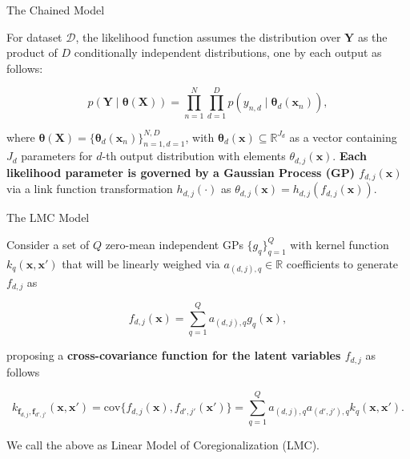 \begin{frame}{The Chained Model}

\begin{block}{}
	For dataset $\mathcal{D}$, the likelihood function assumes the distribution over \(  \boldsymbol{Y} \) as the product of \( D \) conditionally independent distributions, one by each output as follows:
\end{block}

\[
	p(\boldsymbol{Y} \mid \boldsymbol{\theta}(\boldsymbol{X})) = \prod_{n=1}^N \prod_{d=1}^D p\left(y_{n,d} \mid \boldsymbol{\theta}_d(\boldsymbol{x}_n)\right),
\]

\begin{block}{}
	where \( \boldsymbol{\theta}(\boldsymbol{X}) = \{ \boldsymbol{\theta}_d(\boldsymbol{x}_n) \}_{n=1,d=1}^{N, D} \), with \( \boldsymbol{\theta}_d(\boldsymbol{x}) \subseteq \mathbb{R}^{J_d} \) as a vector containing \( J_d \) parameters for \( d \)-th output distribution with elements \( \theta_{d,j}(\boldsymbol{x}) \). \textcolor{BrandTeal}{\textbf{Each likelihood parameter is governed by a Gaussian Process (GP) \( f_{d,j}(\boldsymbol{x}) \)}} via a link function transformation \( h_{d,j}(\cdot) \) as \( \theta_{d,j}(\boldsymbol{x}) = h_{d,j}(f_{d,j}(\boldsymbol{x})) \).
\end{block}

\end{frame}

\begin{frame}{The LMC Model}
	
\begin{block}{}
	Consider a set of \( Q \) zero-mean independent GPs \( \{ g_q \}_{q=1}^Q \) with kernel function \(k_q(\boldsymbol{x}, \boldsymbol{x}')\) that will be linearly weighed via \( a_{(d,j),q} \in \mathbb{R} \) coefficients to generate \( f_{d,j} \) as
\end{block}	


\[
	f_{d,j}(\boldsymbol{x}) = \sum_{q=1}^Q a_{(d,j),q} g_{q}(\boldsymbol{x}),
\]

\begin{block}{}
	proposing a \textcolor{BrandTeal}{\textbf{cross-covariance function for the latent variables \( f_{d,j} \)}} as follows
\end{block}
 
\[
	k_{\boldsymbol{f}_{d,j}, \boldsymbol{f}_{d',j'}}(\boldsymbol{x}, \boldsymbol{x}') = \text{cov}\{f_{d,j}(\boldsymbol{x}), f_{d',j'}(\boldsymbol{x}')\}
	=\sum_{q=1}^Q a_{(d,j),q}a_{(d',j'),q} k_{q}(\boldsymbol{x}, \boldsymbol{x}').
\]

\begin{block}{}
	We call the above as Linear Model of Coregionalization (LMC).
\end{block}

\end{frame}


